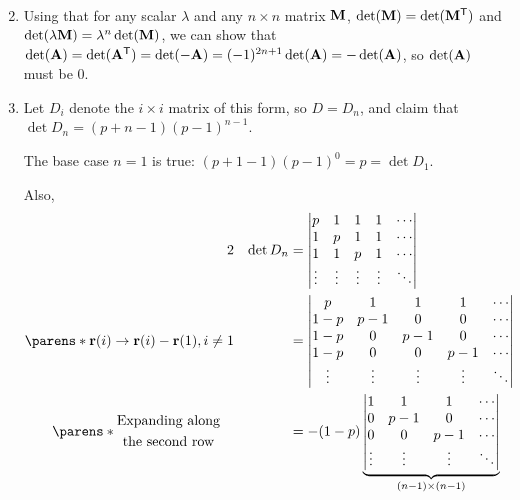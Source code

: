 \documentclass[fleqn,a4paper,11pt]{article}
\begin{document}
\begin{enumerate}[label=\textbf{\arabic*.}]
\begin{alignat*}
   \end{alignat*}
  \item
   Using that for any scalar \(\lambda\) and any \(n \times n\) matrix
   \(\mathbf{M}\), \(\det(\mathbf{M}) = \det(\mathbf{M}^{\mathsf T})\) and
   \(\det(\lambda \mathbf{M}) = \lambda^n \det(\mathbf{M})\), we can show that
   \(\det(\mathbf{A}) = \det(\mathbf{A}^{\mathsf T})
     = \det(-\mathbf{A}) = (-1)^{2n + 1}\det(\mathbf{A}) = -\det(\mathbf{A})\), so
   \(\det(\mathbf{A})\) must be \(0\).
  \item
   Let \(D_i\) denote the \(i \times i\) matrix of this form, so \(D = D_n\),
   and claim that
   \(\det D_n = (p + n - 1)(p - 1)^{n - 1}\).

   The base case \(n = 1\) is true: \((p + 1 - 1)(p - 1)^0 = p = \det D_1\).

   Also,
   \begin{alignat*}2
    && \det D_n
    &= \begin{vmatrix}
     p & 1 & 1 & 1 & \cdots \\
     1 & p & 1 & 1 & \cdots \\
     1 & 1 & p & 1 & \cdots \\
     \vdots & \vdots & \vdots & \vdots & \ddots
    \end{vmatrix} \\
    \parens*{
     \vec r(i) \to \vec r(i) - \vec r(1), i \ne 1
    }
    && &= \begin{vmatrix}
     p & 1 & 1 & 1 & \cdots \\
     1 - p & p - 1 & 0 & 0 & \cdots \\
     1 - p & 0 & p - 1 & 0 & \cdots \\
     1 - p & 0 & 0 & p - 1 & \cdots \\
     \vdots & \vdots & \vdots & \vdots & \ddots
    \end{vmatrix} \\
    \parens*{
     \begin{gathered}
      \text{Expanding along} \\
      \text{the second row}
     \end{gathered}} \quad
    && &= -(1 - p)\underbrace{\begin{vmatrix}
     1 & 1 & 1 & \cdots \\
     0 & p - 1 & 0 & \cdots \\
     0 & 0 & p - 1 & \cdots \\
     \vdots & \vdots & \vdots & \ddots \\
    \end{vmatrix}}_{(n - 1) \times (n - 1)} \\

\end{alignat*}
\end{enumerate}
\end{document}
